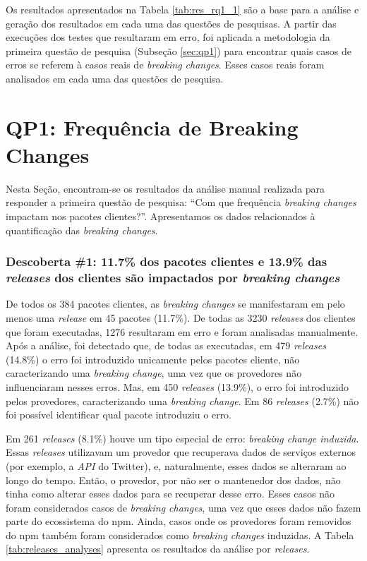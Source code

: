 Os resultados apresentados na Tabela \ref{tab:res_rq1_1} são a base para a análise e geração dos resultados em cada uma das questões de pesquisas. A partir das execuções dos testes que resultaram em erro, foi aplicada a metodologia da primeira questão de pesquisa (Subseção \ref{sec:qp1}) para encontrar quais casos de erros se referem à casos reais de \textit{breaking changes}. Esses casos reais foram analisados em cada uma das questões de pesquisa.


\section{QP1: Frequência de Breaking Changes}
\label{sec:qp1:results}
Nesta Seção, encontram-se os resultados da análise manual realizada para responder a primeira questão de pesquisa: ``Com que frequência \textit{breaking changes} impactam nos pacotes clientes?''. Apresentamos os dados relacionados à quantificação das \textit{breaking changes}.

\subsubsection{Descoberta \#1: 11.7\% dos pacotes clientes e 13.9\% das \textit{releases} dos clientes são impactados por \textit{breaking changes}}
De todos os 384 pacotes clientes, as \textit{breaking changes} se manifestaram em pelo menos uma \textit{release} em 45 pacotes (11.7\%). De todas as 3230 \textit{releases} dos clientes que foram executadas, 1276 resultaram em erro e foram analisadas manualmente. Após a análise, foi detectado que, de todas as executadas, em 479 \textit{releases} (14.8\%) o erro foi introduzido unicamente pelos pacotes cliente, não caracterizando uma \textit{breaking change}, uma vez que os provedores não influenciaram nesses erros. Mas, em 450 \textit{releases} (13.9\%), o erro foi introduzido pelos provedores, caracterizando uma \textit{breaking change}. Em 86 \textit{releases} (2.7\%) não foi possível identificar qual pacote introduziu o erro.

Em 261 \textit{releases} (8.1\%) houve um tipo especial de erro: \textit{breaking change induzida}. Essas \textit{releases} utilizavam um provedor que recuperava dados de serviços externos (por exemplo, a \textit{API} do \textsf{Twitter}), e, naturalmente, esses dados se alteraram ao longo do tempo. Então, o provedor, por não ser o mantenedor dos dados, não tinha como alterar esses dados para se recuperar desse erro. Esses casos não foram considerados casos de \textit{breaking changes}, uma vez que esses dados não fazem parte do ecossistema do \textsf{npm}. Ainda, casos onde os provedores foram removidos do \textsf{npm} também foram considerados como \textit{breaking changes} induzidas. A Tabela \ref{tab:releases_analyses} apresenta os resultados da análise por \textit{releases}.

